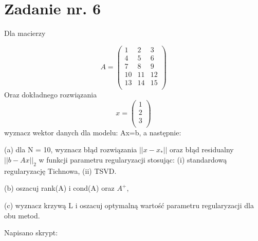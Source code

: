 \documentclass{article}
\begin{document}
\section{Zadanie nr. 6}
Dla macierzy  

\[ A = \begin{pmatrix}  

1 & 2 & 3 \\ 

4 & 5 & 6 \\ 

7 & 8 & 9 \\ 

10 & 11 & 12 \\ 

13 & 14 & 15 \\ 

\end{pmatrix} \] 
Oraz dokładnego rozwiązania 
\[ x = \begin{pmatrix}  

1 \\ 

2 \\ 

3 \\ 

\end{pmatrix} \] 
wyznacz wektor danych dla modelu: Ax=b, a następnie:

(a) dla N = 10, wyznacz błąd rozwiązania $||x-x_*||$ oraz błąd residualny $||b-Ax||_2$ w funkcji parametru regularyzacji stosując: (i) standardową regularyzację Tichnowa,
(ii) TSVD.

(b) oszacuj rank(A) i cond(A) oraz $A^+$,

(c) wyznacz krzywą L i oszacuj optymalną wartość parametru regularyzacji dla obu metod.




Napisano skrypt: 

 
\end{document}

